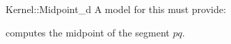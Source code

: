 \begin{ccRefFunctionObjectConcept}{Kernel::Midpoint_d}
A model for this must provide:


 {computes the midpoint of the segment
  $pq$.}

\end{ccRefFunctionObjectConcept}
